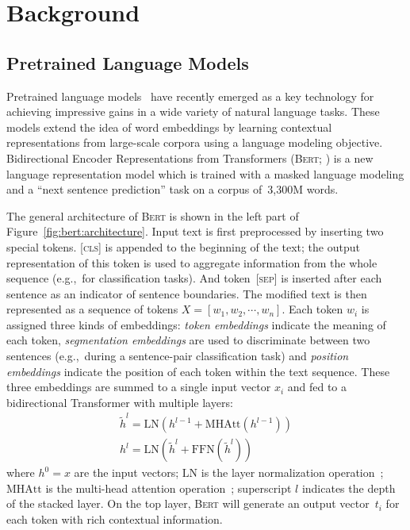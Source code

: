 \documentclass[11pt,a4paper]{article}
\begin{document}
    \section{Background}
    \label{sec:background}
    
    \subsection{Pretrained Language Models}
    \label{sec:pretr-lang-models}
    Pretrained language models~\cite{peters2018deep,radford2018improving,devlin2018bert,dong2019unified,hibert} have recently emerged as a key technology
    for achieving impressive gains in a wide variety of natural language
    tasks.  These models extend the idea of word embeddings
    by learning contextual representations from large-scale corpora using
    a language modeling objective.  Bidirectional Encoder Representations
    from Transformers (\textsc{Bert}; \citealt{devlin2018bert}) is a new
    language representation model which is trained with a masked language
    modeling  and a ``next sentence prediction'' task on a corpus
    of~3,300M words.
    
    The general architecture of \textsc{Bert} is shown in the left part
    of Figure~\ref{fig:bert:architecture}. Input text is first
    preprocessed by inserting two special tokens.  [\textsc{cls}] is
    appended to the beginning of the text; the output representation of
    this token is used to aggregate information from the whole sequence
    (e.g.,~for classification tasks).  And token~[\textsc{sep}] is
    inserted after each sentence as an indicator of sentence boundaries.
    The modified text is then represented as a sequence of tokens
    $X=[w_1,w_2,\cdots,w_n]$. Each token $w_i$ is assigned three kinds of
    embeddings: \emph{token embeddings} indicate the meaning of each
    token, \emph{segmentation embeddings} are used to discriminate between
    two sentences (e.g.,~during a sentence-pair classification task) and
    \emph{position embeddings} indicate the position of each token within
    the text sequence.  These three embeddings are summed to a single
    input vector $x_i$ and fed to a bidirectional Transformer with
    multiple layers:
            \vspace{-0.5ex}
    \begin{gather}
    \tilde{h}^l=\mathrm{LN}(h^{l-1}+\mathrm{MHAtt}(h^{l-1}))\\
    h^l=\mathrm{LN}(\tilde{h}^l+\mathrm{FFN}(\tilde{h}^l))       
    \end{gather}    
    where $h^0=x$ are the input vectors; $\mathrm{LN}$ is the layer
    normalization operation~\cite{ba2016layer}; $\mathrm{MHAtt}$ is
    the multi-head attention operation~\cite{vaswani2017attention};
    superscript $l$ indicates the depth of the stacked layer. On the
    top layer, \textsc{Bert} will generate an output vector~$t_i$ for
    each token with rich contextual information.
    
\end{document}
